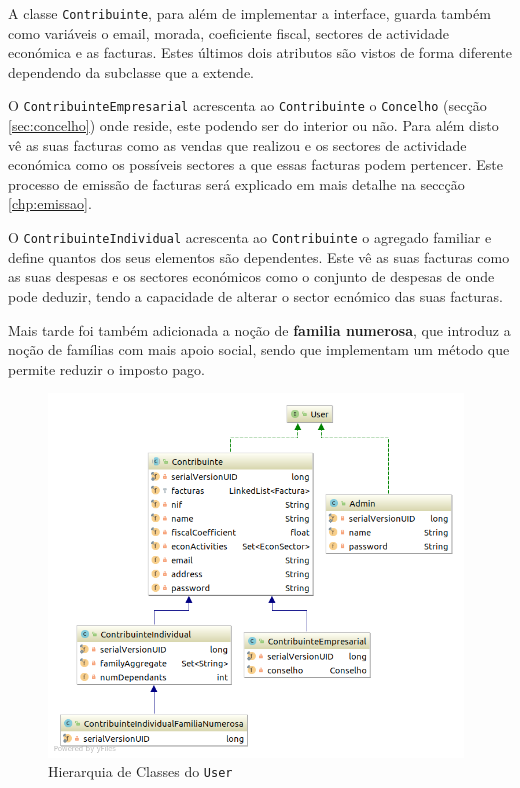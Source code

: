 \documentclass[12pt,a4paper]{report}
\begin{document}
    A classe \texttt{Contribuinte}, para além de implementar a interface,
    guarda também como variáveis o email, morada, coeficiente fiscal, sectores
    de actividade económica e as facturas. Estes últimos dois atributos são
    vistos de forma diferente dependendo da subclasse que a extende.

    O \texttt{ContribuinteEmpresarial} acrescenta ao
    \texttt{Contribuinte} o \texttt{Concelho} (secção
    \ref{sec:concelho}) onde reside, este podendo ser do interior ou não. Para além
    disto vê as suas facturas como as vendas que realizou e os sectores de
    actividade económica como os possíveis sectores a que essas facturas podem
    pertencer. Este processo de emissão de facturas será explicado em mais detalhe
    na seccção \ref{chp:emissao}.

    O \texttt{ContribuinteIndividual} acrescenta ao
    \texttt{Contribuinte} o agregado familiar e define quantos dos seus
    elementos são dependentes. Este vê as suas facturas como as suas despesas e os
    sectores económicos como o conjunto de despesas de onde pode deduzir, tendo a
    capacidade de alterar o sector ecnómico das suas facturas.

    Mais tarde foi também adicionada a noção de \textbf{familia numerosa}, que
    introduz a noção de famílias com mais apoio social, sendo que implementam um
    método que permite reduzir o imposto pago.

    \begin{figure}[H]
        \centering
        \includegraphics[width=11cm]{./images/UserHierarquy.png}
        \caption{Hierarquia de Classes do \texttt{User}}
        \label{fig:Hierarquia}
    \end{figure}
\end{document}
